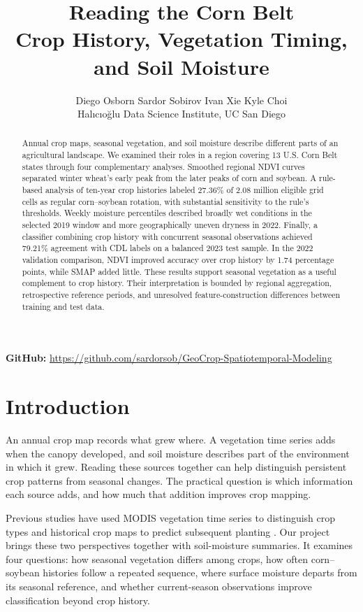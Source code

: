 \documentclass[11pt,letterpaper]{article}
\title{Reading the Corn Belt\\[0.3em]\large Crop History, Vegetation Timing, and Soil Moisture}
\author{Diego Osborn \quad Sardor Sobirov \quad Ivan Xie \quad Kyle Choi\\[3pt]
\small Hal{\i}c{\i}o{\u g}lu Data Science Institute, UC San Diego}
\date{}
\begin{document}
\maketitle
\vspace{-2em}

\begin{abstract}
Annual crop maps, seasonal vegetation, and soil moisture describe different parts of an agricultural landscape. We examined their roles in a region covering 13 U.S. Corn Belt states through four complementary analyses. Smoothed regional NDVI curves separated winter wheat's early peak from the later peaks of corn and soybean. A rule-based analysis of ten-year crop histories labeled 27.36\% of 2.08 million eligible grid cells as regular corn--soybean rotation, with substantial sensitivity to the rule's thresholds. Weekly moisture percentiles described broadly wet conditions in the selected 2019 window and more geographically uneven dryness in 2022. Finally, a classifier combining crop history with concurrent seasonal observations achieved 79.21\% agreement with CDL labels on a balanced 2023 test sample. In the 2022 validation comparison, NDVI improved accuracy over crop history by 1.74 percentage points, while SMAP added little. These results support seasonal vegetation as a useful complement to crop history. Their interpretation is bounded by regional aggregation, retrospective reference periods, and unresolved feature-construction differences between training and test data.
\end{abstract}

{\centering\small\textbf{GitHub: }\url{https://github.com/sardorsob/GeoCrop-Spatiotemporal-Modeling}\par}

\section{Introduction}
\label{sec:introduction}
An annual crop map records what grew where. A vegetation time series adds when the canopy developed, and soil moisture describes part of the environment in which it grew. Reading these sources together can help distinguish persistent crop patterns from seasonal changes. The practical question is which information each source adds, and how much that addition improves crop mapping.

Previous studies have used MODIS vegetation time series to distinguish crop types \citep{wardlow2007modis} and historical crop maps to predict subsequent planting \citep{zhang2019cropprediction}. Our project brings these two perspectives together with soil-moisture summaries. It examines four questions: how seasonal vegetation differs among crops, how often corn--soybean histories follow a repeated sequence, where surface moisture departs from its seasonal reference, and whether current-season observations improve classification beyond crop history.
\end{document}
